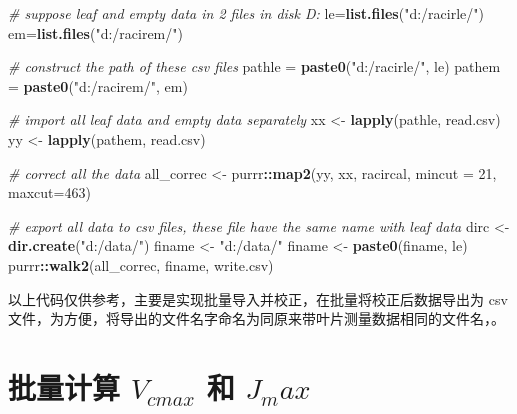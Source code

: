 \documentclass[
]{krantz}
\makeatletter
\newenvironment{Shaded}{\begin{snugshade}}{\end{snugshade}}
\newcommand{\CommentTok}[1]{\textcolor[rgb]{0.56,0.35,0.01}{\textit{#1}}}
\newcommand{\DataTypeTok}[1]{\textcolor[rgb]{0.13,0.29,0.53}{#1}}
\newcommand{\DecValTok}[1]{\textcolor[rgb]{0.00,0.00,0.81}{#1}}
\newcommand{\KeywordTok}[1]{\textcolor[rgb]{0.13,0.29,0.53}{\textbf{#1}}}
\newcommand{\NormalTok}[1]{#1}
\newcommand{\OperatorTok}[1]{\textcolor[rgb]{0.81,0.36,0.00}{\textbf{#1}}}
\newcommand{\StringTok}[1]{\textcolor[rgb]{0.31,0.60,0.02}{#1}}
\newenvironment{kframe}{%
\medskip{}
\setlength{\fboxsep}{.8em}
 \def\at@end@of@kframe{}%
 \ifinner\ifhmode%
  \def\at@end@of@kframe{\end{minipage}}%
  \begin{minipage}{\columnwidth}%
 \fi\fi%
 \def\FrameCommand##1{\hskip\@totalleftmargin \hskip-\fboxsep
 \colorbox{shadecolor}{##1}\hskip-\fboxsep
     \hskip-\linewidth \hskip-\@totalleftmargin \hskip\columnwidth}%
 \MakeFramed {\advance\hsize-\width
   \@totalleftmargin\z@ \linewidth\hsize
   \@setminipage}}%
 {\par\unskip\endMakeFramed%
 \at@end@of@kframe}
\renewenvironment{Shaded}{\begin{kframe}}{\end{kframe}}
\makeatother
\begin{document}
\begin{Shaded}
\begin{Highlighting}[]
\CommentTok{# suppose leaf and empty data in 2 files in disk D:}
\NormalTok{le=}\KeywordTok{list.files}\NormalTok{(}\StringTok{"d:/racirle/"}\NormalTok{)}
\NormalTok{em=}\KeywordTok{list.files}\NormalTok{(}\StringTok{"d:/racirem/"}\NormalTok{)}

\CommentTok{# construct the path of these csv files}
\NormalTok{pathle =}\StringTok{ }\KeywordTok{paste0}\NormalTok{(}\StringTok{"d:/racirle/"}\NormalTok{, le)}
\NormalTok{pathem =}\StringTok{ }\KeywordTok{paste0}\NormalTok{(}\StringTok{"d:/racirem/"}\NormalTok{, em)}

\CommentTok{# import all leaf data and empty data separately}
\NormalTok{xx <-}\StringTok{ }\KeywordTok{lapply}\NormalTok{(pathle, read.csv)}
\NormalTok{yy <-}\StringTok{ }\KeywordTok{lapply}\NormalTok{(pathem, read.csv)}

\CommentTok{# correct all the data}
\NormalTok{all_correc <-}\StringTok{ }\NormalTok{purrr}\OperatorTok{::}\KeywordTok{map2}\NormalTok{(yy, xx, racircal, }\DataTypeTok{mincut =} \DecValTok{21}\NormalTok{, }\DataTypeTok{maxcut=}\DecValTok{463}\NormalTok{)}

\CommentTok{#  export all data to csv files, these file have the same name with leaf data}
\NormalTok{dirc <-}\StringTok{ }\KeywordTok{dir.create}\NormalTok{(}\StringTok{"d:/data/"}\NormalTok{)}
\NormalTok{finame <-}\StringTok{ "d:/data/"}
\NormalTok{finame <-}\StringTok{ }\KeywordTok{paste0}\NormalTok{(finame, le)}
\NormalTok{purrr}\OperatorTok{::}\KeywordTok{walk2}\NormalTok{(all_correc,  finame, write.csv)}
\end{Highlighting}
\end{Shaded}

以上代码仅供参考，主要是实现批量导入并校正，在批量将校正后数据导出为 csv 文件，为方便，将导出的文件名字命名为同原来带叶片测量数据相同的文件名，。

\hypertarget{fitbatracir}{%
\section{\texorpdfstring{批量计算 \(V_{cmax}\) 和 \(J_max\)}{批量计算 V\_\{cmax\} 和 J\_max}}\label{fitbatracir}}
\end{document}
